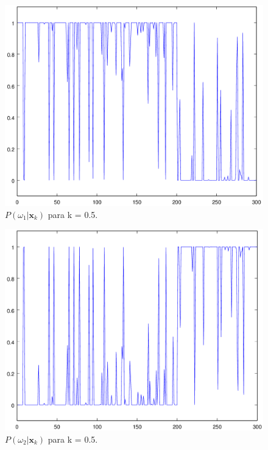 \documentclass[12pt,twoside]{report}
\newcommand{\captiontext}[1]{\small{#1}}
\begin{document}
\begin{figure}[H]
    \centering
    \includegraphics[scale=0.35]{parzen-h05-pw1}
    \caption{\captiontext{$P(\omega_1|\mathbf{x}_k)$ para k = 0.5.}}
    \label{fig:parzen-h05-pw1}
\end{figure}

\begin{figure}[H]
    \centering
    \includegraphics[scale=0.35]{parzen-h05-pw2}
    \caption{\captiontext{$P(\omega_2|\mathbf{x}_k)$ para k = 0.5.}}
    \label{fig:parzen-h05-pw2}
\end{figure}
\end{document}
